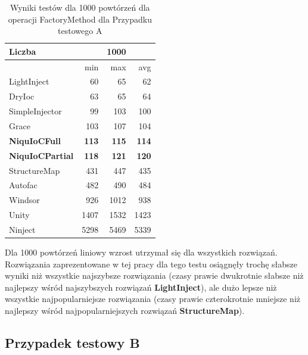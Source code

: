 \documentclass[12pt]{article}
\begin{document}
\begin{table}[H]
\captionsetup{belowskip=0pt,aboveskip=0pt}
\begin{center}
\begin{small}
	\begin{tabular}{ | l | r r r | }
    		\hline
Liczba & & 1000 & \\ \hline
 & min & max & avg \\ \hline
LightInject & 60 & 65 & 62 \\ \hline
DryIoc & 63 & 65 & 64 \\ \hline
SimpleInjector & 99 & 103 & 100 \\ \hline
Grace & 103 & 107 & 104 \\ \hline
\textbf{NiquIoCFull} & \textbf{113} & \textbf{115} & \textbf{114} \\ \hline
\textbf{NiquIoCPartial} & \textbf{118} & \textbf{121} & \textbf{120} \\ \hline
StructureMap & 431 & 447 & 435 \\ \hline
Autofac & 482 & 490 & 484 \\ \hline
Windsor & 926 & 1012 & 938 \\ \hline
Unity & 1407 & 1532 & 1423 \\ \hline
Ninject & 5298 & 5469 & 5339 \\ \hline
  	\end{tabular}
\end{small}
\end{center}
\caption{Wyniki testów dla 1000 powtórzeń dla operacji FactoryMethod dla Przypadku testowego A}
\label{TestCaseA_FactoryMethod1000}
\end{table}
Dla 1000 powtórzeń liniowy wzrost utrzymał się dla wszystkich rozwiązań. Rozwiązania zaprezentowane w tej pracy dla tego testu osiągnęły trochę słabsze wyniki niż wszystkie najszybsze rozwiązania (czasy prawie dwukrotnie słabsze niż najlepszy wśród najszybszych rozwiązań \textbf{LightInject}), ale dużo lepsze niż wszystkie najpopularniejsze rozwiązania (czasy prawie czterokrotnie mniejsze niż najlepszy wśród najpopularniejszych rozwiązań \textbf{StructureMap}).


\subsection{Przypadek testowy B}
\end{document}
